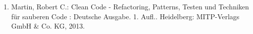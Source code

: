\documentclass[9.5pt,a4paper,bibliography=totocnumbered,listof=totocnumbered]{scrartcl}
\begin{document}






\renewcommand\refname{Quellenverzeichnis}


\vspace{10px}
\begin{enumerate}
	

	\item Martin, Robert C.: Clean Code - Refactoring, Patterns, Testen und Techniken für sauberen Code : Deutsche Ausgabe. 1. Aufl.. Heidelberg: MITP-Verlags GmbH \& Co. KG, 2013.

\end{enumerate}


\pagebreak

\end{document}
